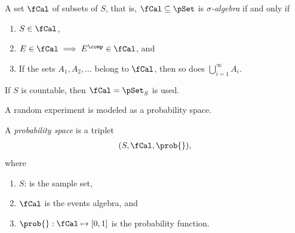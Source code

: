 \begin{mydefinition}
    A set $\fCal$ of subsets of $S$, that is, $\fCal\subseteq \pSet$ is \emph{$\sigma$-algebra} if and only if
    \begin{enumerate}
        \item $S\in\fCal$,
        \item $E\in\fCal\implies E^{\comp}\in\fCal$, and
        \item If the sets $A_{1}, A_{2}, \ldots$ belong to $\fCal$, then so does $\bigcup_{i=1}^{\infty}A_{i}$.
    \end{enumerate}
    If $S$ is countable, then $\fCal=\pSet_{S}$ is used.
\end{mydefinition}
A random experiment is modeled as a probability space.
\begin{mydefinition}
    \label{def: proability space}
    A \emph{probability space} is a triplet
    \begin{align}
        (S, \fCal, \prob{}),
    \end{align}
    where
    \begin{enumerate}
        \item $S$: is the sample set,
        \item $\fCal$ is the events algebra, and
        \item $\prob{}:\fCal\mapsto[0,1]$ is the probability function.
    \end{enumerate}
\end{mydefinition}

